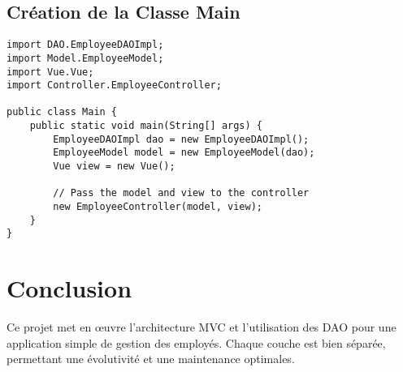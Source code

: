 \documentclass[12pt,a4paper]{article}
\begin{document}
\subsection{Création de la Classe Main}
\begin{lstlisting}
import DAO.EmployeeDAOImpl;
import Model.EmployeeModel;
import Vue.Vue;
import Controller.EmployeeController;

public class Main {
    public static void main(String[] args) {
        EmployeeDAOImpl dao = new EmployeeDAOImpl();
        EmployeeModel model = new EmployeeModel(dao);
        Vue view = new Vue();

        // Pass the model and view to the controller
        new EmployeeController(model, view);
    }
}

\end{lstlisting}

\section{Conclusion}
Ce projet met en œuvre l'architecture MVC et l'utilisation des DAO pour une application simple de gestion des employés.  
Chaque couche est bien séparée, permettant une évolutivité et une maintenance optimales.
\end{document}
